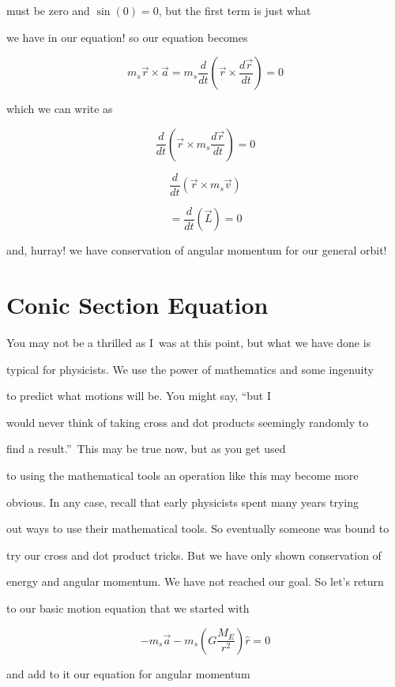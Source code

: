 must be zero and $\sin \left( 0\right) =0$, but the first term is just what

we have in our equation! so our equation becomes%

$$m_{s}\overrightarrow{r}\times \overrightarrow{a}=m_{s}\frac{d}{dt}\left( \overrightarrow{r}\times \frac{d\overrightarrow{r}}{dt}\right) =0$$

which we can write as%

$$\frac{d}{dt}\left( \overrightarrow{r}\times m_{s}\frac{d\overrightarrow{r}}{dt}\right) =0$$

$$\frac{d}{dt}\left( \overrightarrow{r}\times m_{s}\overrightarrow{v}\right) $$



$$=\frac{d}{dt}\left( \overrightarrow{L}\right) =0$$

and, hurray! we have conservation of angular momentum for our general orbit!


\section{Conic Section Equation}


You may not be a thrilled as I\ was at this point, but what we have done is

typical for physicists. We use the power of mathematics and some ingenuity

to predict what motions will be. You might say, \textquotedblleft but I\

would never think of taking cross and dot products seemingly randomly to

find a result.\textquotedblright\ This may be true now, but as you get used

to using the mathematical tools an operation like this may become more

obvious. In any case, recall that early physicists spent many years trying

out ways to use their mathematical tools. So eventually someone was bound to

try our cross and dot product tricks. But we have only shown conservation of

energy and angular momentum. We have not reached our goal. So let's return

to our basic motion equation that we started with%

$$-m_{s}\overrightarrow{a}-m_{s}\left( G\frac{M_{E}}{r^{2}}\right) \hat{r}=0 $$

and add to it our equation for angular momentum 

